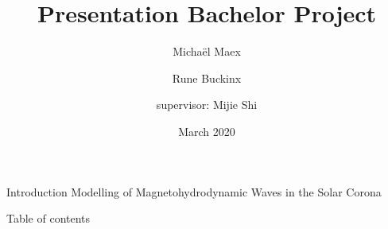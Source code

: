 \documentclass{beamer}
\title{Presentation Bachelor Project}
\author{\phantom{=}  Micha\"el Maex \and Rune Buckinx \and supervisor: Mijie Shi }
\date{March 2020}
\begin{document}
\maketitle
\begin{frame}{Introduction} %
    \huge{Modelling of Magnetohydrodynamic Waves in the Solar Corona}\\
\end{frame}

\begin{frame}{Table of contents}
    \tableofcontents
\end{frame}
\end{document}
